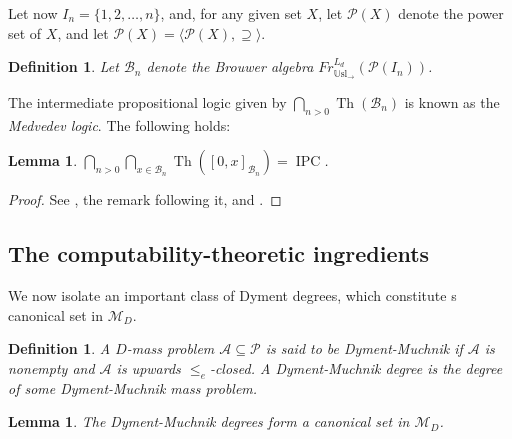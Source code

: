 \documentclass[11pt]{amsart}
\newtheorem{lemma}[theorem]{Lemma}
\newtheorem{defi}[theorem]{Definition}
\newenvironment{definition}{\begin{defi} \rm}{ \end{defi}}
\newcommand{\Th}{\operatorname{Th}}
\newcommand{\IPC}{\operatorname{IPC}}
\newcommand{\Usl}{\mathbb{U}\textrm{sl}}
\newcommand{\MP}[1]{\ensuremath{\mathcal{#1}}}
\begin{document}
Let now $I_n=\{1,2, \ldots,n\}$, and, for any given set $X$, let 
$\mathcal{P}(X)$ denote the power set of $X$, and let $\mathscr{P}(X)= 
\langle \mathcal{P}(X), \supseteq \rangle$. 

\begin{definition}
Let $\mathscr{B}_n$  denote the Brouwer algebra  
$Fr^{L_d}_{\Usl_{\rightarrow}} (\mathscr{P}(I_n))$. 
\end{definition}

The intermediate propositional logic given by $\bigcap_{n>0} 
\Th(\mathcal{B}_n)$ is known as the \emph{Medvedev logic}. The following 
holds: 

\begin{lemma}\label{lem:free}
$\bigcap_{n>0} \bigcap_{x \in \mathscr{B}_n}
      \Th([0,x]_{\mathscr{B}_n})= \IPC$.
\end{lemma}

\begin{proof}
See \cite[Lemma~3]{Skvortsova:intuitionism}, the remark following it, and 
\cite[Propositions~4.6~and~4.7]{Kuyper-Medvedev}. 
\end{proof}

\subsection{The computability-theoretic  ingredients}
\label{ssct:ingredients} We now isolate an important class of Dyment degrees, 
which constitute s canonical set in $\mathscr{M}_D$. 

\begin{definition}
A $D$-mass problem $\MP{A} \subseteq \MP{P}$ is said to be 
\emph{Dyment-Muchnik} if $\MP{A}$ is nonempty and $\MP{A}$ is upwards 
$\leq_e$-closed. A \emph{Dyment-Muchnik} degree is the degree of some 
Dyment-Muchnik mass problem. 
\end{definition}

\begin{lemma}\label{lem:can1}
The Dyment-Muchnik degrees form a canonical set in $\mathscr{M}_D$.
\end{lemma}
\end{document}
